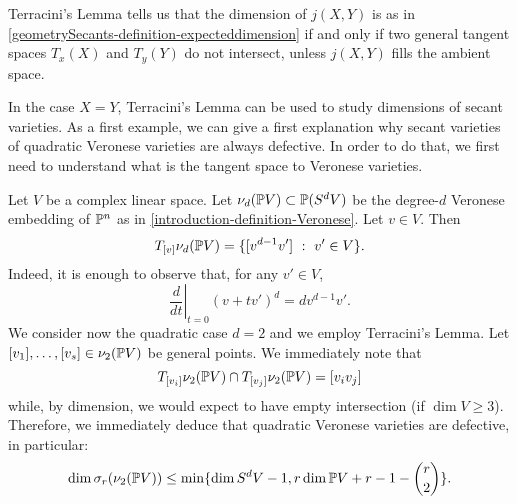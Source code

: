 \begin{remark}
\label{geometrySecants-remark-terracini}
    Terracini's Lemma tells us that the dimension of $j(X,Y)$ is as in \ref{geometrySecants-definition-expecteddimension} if and only if two general tangent spaces $T_x(X)$ and $T_y(Y)$ do not intersect, unless $j(X,Y)$ fills the ambient space. 
\end{remark}

In the case $X = Y$, Terracini's Lemma can be used to study dimensions of secant varieties. As a first example, we can give a first explanation why secant varieties of quadratic Veronese varieties are always defective. In order to do that, we first need to understand what is the tangent space to Veronese varieties. 

\begin{example}
\label{geometrySecants-lemma-quadratic_Veronese_defective}
    Let $V$ be a complex linear space. Let $\nu_d(\mathbb{P} V) \subset \mathbb{P}(S^d V)$ be the degree-$d$ Veronese embedding of $\mathbb{P}^n$ as in \ref{introduction-definition-Veronese}. Let $v \in V$. Then
    \[
        T_{[v]}\nu_d(\mathbb{P} V) = \{[v^{d-1}v'] ~:~ v' \in V\}. 
    \]
    Indeed, it is enough to observe that, for any $v' \in V$,
    \[
        \left.\frac{d}{dt}\right|_{t = 0}(v+tv')^{d} = dv^{d-1}v'.
    \]
    We consider now the quadratic case $d = 2$ and we employ Terracini's Lemma. Let $[v_1],\ldots,[v_s] \in \nu_2(\mathbb{P} V)$ be general points. We immediately note that 
    \[
        T_{[v_i]}\nu_2(\mathbb{P} V) \cap T_{[v_j]}\nu_2(\mathbb{P} V) = [v_iv_j]
    \]
    while, by dimension, we would expect to have empty intersection (if $\dim V \geq 3$). Therefore, we immediately deduce that quadratic Veronese varieties are defective, in particular:
    \[
        \dim \sigma_r(\nu_2(\mathbb{P} V)) \leq \min \{\dim S^dV - 1, r\dim \mathbb{P} V + r - 1 - {r \choose 2}\}.  
    \]
\end{example}
